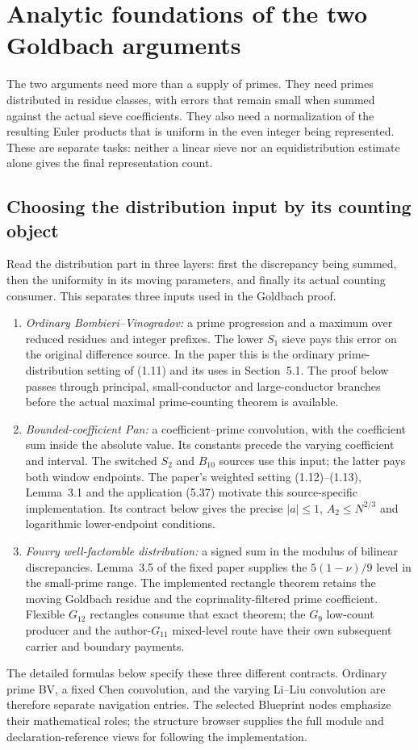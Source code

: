 \section{Analytic foundations of the two Goldbach arguments}

The two arguments need more than a supply of primes.
They need primes distributed in residue classes, with errors that remain small
when summed against the actual sieve coefficients.
They also need a normalization of the resulting Euler products that is uniform
in the even integer being represented.
These are separate tasks: neither a linear sieve nor an equidistribution
estimate alone gives the final representation count.


\subsection{Choosing the distribution input by its counting object}
\label{sec:distribution-reading-route}
Read the distribution part in three layers: first the discrepancy being
summed, then the uniformity in its moving parameters, and finally its actual
counting consumer. This separates three inputs used in the Goldbach proof.
\begin{enumerate}
\item \emph{Ordinary Bombieri--Vinogradov:} a prime progression and a maximum
over reduced residues and integer prefixes. The lower $S_1$ sieve pays this
error on the original difference source. In the paper this is the ordinary
prime-distribution setting of (1.11) and its uses in Section~5.1.
The proof below passes through principal, small-conductor and large-conductor
branches before the actual maximal prime-counting theorem is available.
\item \emph{Bounded-coefficient Pan:} a coefficient--prime convolution, with
the coefficient sum inside the absolute value. Its constants precede the
varying coefficient and interval. The switched $S_2$ and $B_{10}$ sources use
this input; the latter pays both window endpoints. The paper's weighted
setting (1.12)--(1.13), Lemma~3.1 and the application (5.37) motivate this
source-specific implementation. Its contract below gives the precise
$|a|\le1$, $A_2\le N^{2/3}$ and logarithmic lower-endpoint conditions.
\item \emph{Fouvry well-factorable distribution:} a signed sum in the modulus
of bilinear discrepancies. Lemma~3.5 of the fixed paper supplies the
$5(1-\nu)/9$ level in the small-prime range. The implemented rectangle theorem
retains the moving Goldbach residue and the coprimality-filtered prime
coefficient. Flexible $G_{12}$ rectangles consume that exact theorem; the
$G_9$ low-count producer and the author-$G_{11}$ mixed-level route have their
own subsequent carrier and boundary payments.
\end{enumerate}
The detailed formulas below specify these three different contracts.
Ordinary prime BV, a fixed Chen convolution, and the varying Li--Liu
convolution are therefore separate navigation entries. The selected Blueprint
nodes emphasize their mathematical roles; the structure browser supplies the
full module and declaration-reference views for following the implementation.

